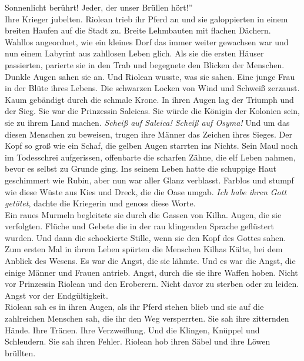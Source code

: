 Sonnenlicht berührt! Jeder, der unser Brüllen hört!''\\
Ihre Krieger jubelten. Riolean trieb ihr Pferd an und sie galoppierten in einem breiten Haufen 
auf die Stadt zu. Breite Lehmbauten mit flachen Dächern. Wahllos angeordnet, wie ein kleines 
Dorf das immer weiter gewachsen war und nun einem Labyrint aus zahllosen Leben glich. Als sie die 
ersten Häuser passierten, parierte sie in den Trab und begegnete den Blicken der Menschen. Dunkle 
Augen sahen sie an. Und Riolean wusste, was sie sahen. Eine junge Frau in der Blüte ihres Lebens. 
Die schwarzen Locken von Wind und Schweiß zerzaust. Kaum gebändigt durch die schmale Krone. In ihren 
Augen lag der Triumph und der Sieg. Sie war die Prinzessin Saleicas. Sie würde die Königin der 
Kolonien sein, sie zu ihrem Land machen. \textit{Scheiß auf Saleica! Scheiß auf Osyma!}
Und um das diesen Menschen zu beweisen, trugen ihre Männer das Zeichen ihres Sieges. Der Kopf so 
groß wie ein Schaf, die gelben Augen starrten ins Nichts. Sein Maul noch im Todesschrei 
aufgerissen, offenbarte die scharfen Zähne, die elf Leben nahmen, bevor es selbst zu Grunde ging. 
Ins seinem Leben hatte die schuppige Haut geschimmert wie Rubin, aber nun war aller Glanz 
verblasst. Farblos und stumpf wie diese Wüste aus Kies und Dreck, die die Oase umgab.
\textit{Ich habe ihren Gott getötet}, dachte die Kriegerin und genoss diese Worte.\\
Ein raues Murmeln begleitete sie durch die Gassen von Kilha. Augen, die sie verfolgten. Flüche und 
Gebete die in der rau klingenden Sprache geflüstert wurden. Und dann die schockierte Stille, wenn 
sie den Kopf des Gottes sahen. Zum ersten Mal in ihrem Leben spürten die Menschen Kilhas Kälte, bei 
dem Anblick des Wesens. Es war die Angst, die sie lähmte. Und es war die Angst, die einige Männer 
und Frauen antrieb. Angst, durch die sie ihre Waffen hoben. Nicht vor Prinzessin Riolean und den 
Eroberern. Nicht davor zu sterben oder zu leiden. Angst vor der Endgültigkeit.\\
Riolean sah es in ihren Augen, als ihr Pferd stehen blieb und sie auf die zahlreichen Menschen sah, 
die ihr den Weg versperrten. Sie sah ihre zitternden Hände. Ihre Tränen. Ihre Verzweiflung. Und die 
Klingen, Knüppel und Schleudern. Sie sah ihren Fehler. Riolean hob ihren Säbel und ihre Löwen 
brüllten.